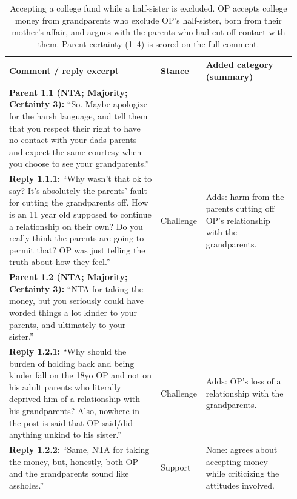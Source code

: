 \begin{table}[H]
\centering
\small
\setlength{\tabcolsep}{4pt}
\renewcommand{\arraystretch}{1.15}
\caption{Accepting a college fund while a half-sister is excluded. OP accepts college money from grandparents who exclude OP's half-sister, born from their mother's affair, and argues with the parents who had cut off contact with them. Parent certainty (1--4) is scored on the full comment.}
\label{tab:reason-examples-17v3n65}
\begin{tabular}{@{}p{0.52\linewidth}p{0.11\linewidth}p{0.31\linewidth}@{}}
\toprule
Comment / reply excerpt & Stance & Added category (summary) \\
\midrule
\textbf{Parent 1.1 (NTA; Majority; Certainty 3):} ``So. Maybe apologize for the harsh language, and tell them that you respect their right to have no contact with your dads parents and expect the same courtesy when you choose to see your grandparents.'' & & \\
\addlinespace[3pt]
\textbf{Reply 1.1.1:} ``Why wasn't that ok to say? It's absolutely the parents' fault for cutting the grandparents off. How is an 11 year old supposed to continue a relationship on their own? Do you really think the parents are going to permit that? OP was just telling the truth about how they feel.'' & Challenge & Adds: harm from the parents cutting off OP's relationship with the grandparents. \\
\addlinespace[3pt]
\midrule
\textbf{Parent 1.2 (NTA; Majority; Certainty 3):} ``NTA for taking the money, but you seriously could have worded things a lot kinder to your parents, and ultimately to your sister.'' & & \\
\addlinespace[3pt]
\textbf{Reply 1.2.1:} ``Why should the burden of holding back and being kinder fall on the 18yo OP and not on his adult parents who literally deprived him of a relationship with his grandparents? Also, nowhere in the post is said that OP said/did anything unkind to his sister.'' & Challenge & Adds: OP's loss of a relationship with the grandparents. \\
\addlinespace[3pt]
\textbf{Reply 1.2.2:} ``Same, NTA for taking the money, but, honestly, both OP and the grandparents sound like assholes.'' & Support & None: agrees about accepting money while criticizing the attitudes involved. \\

\end{tabular}
\end{table}
